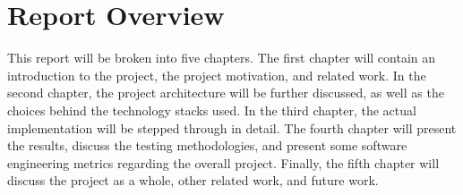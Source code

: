 \section{Report Overview}
\label{sect:report-overview}
This report will be broken into five chapters.  The first chapter will contain
an introduction to the project, the project motivation, and related work.  In
the second chapter, the project architecture will be further discussed, as well
as the choices behind the technology stacks used.  In the third chapter, the
actual implementation will be stepped through in detail.  The fourth chapter
will present the results, discuss the testing methodologies, and present some
software engineering metrics regarding the overall project.  Finally, the fifth
chapter will discuss the project as a whole, other related work, and future work.
